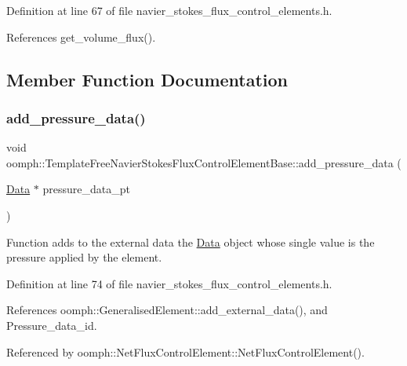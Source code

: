 Definition at line 67 of file navier\+\_\+stokes\+\_\+flux\+\_\+control\+\_\+elements.\+h.



References get\+\_\+volume\+\_\+flux().



\subsection{Member Function Documentation}
\mbox{\label{classoomph_1_1TemplateFreeNavierStokesFluxControlElementBase_a494ba420ccfba69e09cd6a6e7dc7225c}} 
\subsubsection{\texorpdfstring{add\+\_\+pressure\+\_\+data()}{add\_pressure\_data()}}
{\footnotesize\ttfamily void oomph\+::\+Template\+Free\+Navier\+Stokes\+Flux\+Control\+Element\+Base\+::add\+\_\+pressure\+\_\+data (\begin{DoxyParamCaption}\item[{\hyperlink{classoomph_1_1Data}{Data} $\ast$}]{pressure\+\_\+data\+\_\+pt }\end{DoxyParamCaption})\hspace{0.3cm}{\ttfamily [inline]}}



Function adds to the external data the \hyperlink{classoomph_1_1Data}{Data} object whose single value is the pressure applied by the element. 



Definition at line 74 of file navier\+\_\+stokes\+\_\+flux\+\_\+control\+\_\+elements.\+h.



References oomph\+::\+Generalised\+Element\+::add\+\_\+external\+\_\+data(), and Pressure\+\_\+data\+\_\+id.



Referenced by oomph\+::\+Net\+Flux\+Control\+Element\+::\+Net\+Flux\+Control\+Element().

